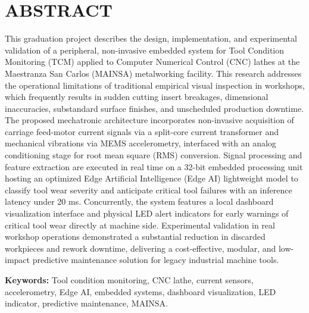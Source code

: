 \section*{ABSTRACT}

This graduation project describes the design, implementation, and experimental validation of a peripheral, non-invasive embedded system for Tool Condition Monitoring (TCM) applied to Computer Numerical Control (CNC) lathes at the Maestranza San Carlos (MAINSA) metalworking facility. This research addresses the operational limitations of traditional empirical visual inspection in workshops, which frequently results in sudden cutting insert breakages, dimensional inaccuracies, substandard surface finishes, and unscheduled production downtime. The proposed mechatronic architecture incorporates non-invasive acquisition of carriage feed-motor current signals via a split-core current transformer and mechanical vibrations via MEMS accelerometry, interfaced with an analog conditioning stage for root mean square (RMS) conversion. Signal processing and feature extraction are executed in real time on a 32-bit embedded processing unit hosting an optimized Edge Artificial Intelligence (Edge AI) lightweight model to classify tool wear severity and anticipate critical tool failures with an inference latency under 20 ms. Concurrently, the system features a local dashboard visualization interface and physical LED alert indicators for early warnings of critical tool wear directly at machine side. Experimental validation in real workshop operations demonstrated a substantial reduction in discarded workpieces and rework downtime, delivering a cost-effective, modular, and low-impact predictive maintenance solution for legacy industrial machine tools.

\textbf{Keywords:} Tool condition monitoring, CNC lathe, current sensors, accelerometry, Edge AI, embedded systems, dashboard visualization, LED indicator, predictive maintenance, MAINSA.
